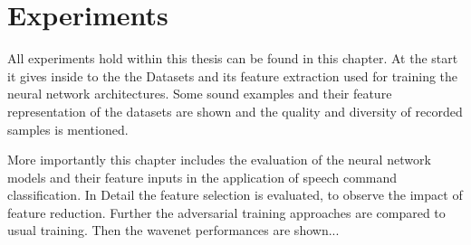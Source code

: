 
\chapter{Experiments}\label{sec:exp}
All experiments hold within this thesis can be found in this chapter.
At the start it gives inside to the the Datasets and its feature extraction used for training the neural network architectures.
Some sound examples and their feature representation of the datasets are shown and the quality and diversity of recorded samples is mentioned.

More importantly this chapter includes the evaluation of the neural network models and their feature inputs in the application of speech command classification.
In Detail the feature selection is evaluated, to observe the impact of feature reduction.
Further the adversarial training approaches are compared to usual training.
Then the wavenet performances are shown...



%
%








